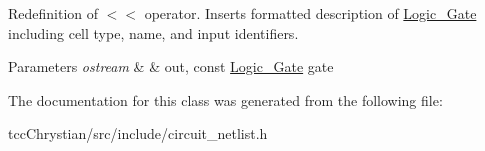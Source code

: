 Redefinition of $<$$<$ operator. Inserts formatted description of \hyperlink{structCircuit__Netlist_1_1Logic__Gate}{Logic\-\_\-\-Gate} including cell type, name, and input identifiers. 


\begin{DoxyParams}{Parameters}
{\em ostream} & \& out, const \hyperlink{structCircuit__Netlist_1_1Logic__Gate}{Logic\-\_\-\-Gate} gate \\
\hline
\end{DoxyParams}


The documentation for this class was generated from the following file\-:\begin{DoxyCompactItemize}
\item 
tcc\-Chrystian/src/include/circuit\-\_\-netlist.\-h\end{DoxyCompactItemize}
